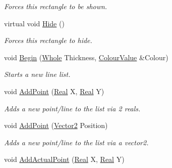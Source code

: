 \begin{DoxyCompactItemize}
\begin{DoxyCompactList}\small\item\em Forces this rectangle to be shown. \item\end{DoxyCompactList}\item 
\hypertarget{classphys_1_1UI_1_1LineList_a4e1d09adc4ed6947d93ae6030e00263e}{
virtual void \hyperlink{classphys_1_1UI_1_1LineList_a4e1d09adc4ed6947d93ae6030e00263e}{Hide} ()}
\label{d7/de8/classphys_1_1UI_1_1LineList_a4e1d09adc4ed6947d93ae6030e00263e}

\begin{DoxyCompactList}\small\item\em Forces this rectangle to hide. \item\end{DoxyCompactList}\item 
void \hyperlink{classphys_1_1UI_1_1LineList_af9768ac753852b412a11c2e77bad0dd6}{Begin} (\hyperlink{namespacephys_a460f6bc24c8dd347b05e0366ae34f34a}{Whole} Thickness, \hyperlink{classphys_1_1ColourValue}{ColourValue} \&Colour)
\begin{DoxyCompactList}\small\item\em Starts a new line list. \item\end{DoxyCompactList}\item 
void \hyperlink{classphys_1_1UI_1_1LineList_afbd4593215f51882f4540229e14da807}{AddPoint} (\hyperlink{namespacephys_af7eb897198d265b8e868f45240230d5f}{Real} X, \hyperlink{namespacephys_af7eb897198d265b8e868f45240230d5f}{Real} Y)
\begin{DoxyCompactList}\small\item\em Adds a new point/line to the list via 2 reals. \item\end{DoxyCompactList}\item 
void \hyperlink{classphys_1_1UI_1_1LineList_ac83ad81a0df3c6a8a70ef0dd6dd4273c}{AddPoint} (\hyperlink{classphys_1_1Vector2}{Vector2} Position)
\begin{DoxyCompactList}\small\item\em Adds a new point/line to the list via a vector2. \item\end{DoxyCompactList}\item 
void \hyperlink{classphys_1_1UI_1_1LineList_a7e1b7d1f3e647e3fe2d4c7868268b0e3}{AddActualPoint} (\hyperlink{namespacephys_af7eb897198d265b8e868f45240230d5f}{Real} X, \hyperlink{namespacephys_af7eb897198d265b8e868f45240230d5f}{Real} Y)

\end{DoxyCompactItemize}
